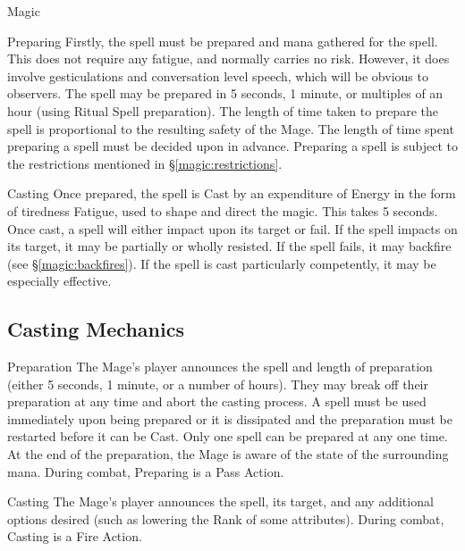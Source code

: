 \begin{Chapter}{Magic}
\begin{Description}
  \item[Preparing] Firstly, the spell must be prepared and mana
    gathered for the spell.  This does not require any fatigue, and
    normally carries no risk. However, it does involve gesticulations
    and conversation level speech, which will be obvious to observers.
    The spell may be prepared in 5 seconds, 1 minute, or multiples of
    an hour (using Ritual Spell preparation). The length of time taken
    to prepare the spell is proportional to the resulting safety of
    the Mage.  The length of time spent preparing a spell must be
    decided upon in advance.  Preparing a spell is subject to the
    restrictions mentioned in \S\ref{magic:restrictions}.

\item[Casting] Once prepared, the spell is Cast by an expenditure of
  Energy in the form of tiredness Fatigue, used to shape and direct
  the magic.  This takes 5 seconds.  Once cast, a spell will either
  impact upon its target or fail.  If the spell impacts on its target,
  it may be partially or wholly resisted.  If the spell fails, it may
  backfire (see \S\ref{magic:backfires}).  If the spell is cast
  particularly competently, it may be especially effective.
\end{Description}

\subsection{Casting Mechanics}

\begin{Description}

\item[Preparation] The Mage’s player announces the spell and length of
  preparation (either 5 seconds, 1 minute, or a number of hours). They
  may break off their preparation at any time and abort the casting
  process.  A spell must be used immediately upon being prepared or it
  is dissipated and the preparation must be restarted before it can be
  Cast.  Only one spell can be prepared at any one time.  At the end
  of the preparation, the Mage is aware of the state of the
  surrounding mana.  During combat, Preparing is a Pass Action.

\item[Casting] The Mage’s player announces the spell, its target, and
  any additional options desired (such as lowering the Rank of some
  attributes).  During combat, Casting is a Fire Action.


\end{Description}
\end{Chapter}
